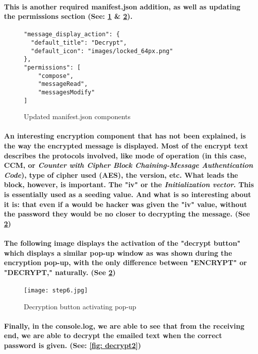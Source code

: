 \paragraph{This is another required manifest.json addition, as well as updating the permissions section (See: \ref{fig: updateManifest} \& \ref{fig: decrypt1}).}

\begin{figure}[H]
\centering
\begin{verbatim}
"message_display_action": {
  "default_title": "Decrypt",
  "default_icon": "images/locked_64px.png"
},
"permissions": [
    "compose",
    "messageRead",
	"messagesModify"
]
\end{verbatim}
\caption{\label{fig: updateManifest} Updated manifest.json components}
\end{figure}

\paragraph{An interesting encryption component that has not been explained, is the way the encrypted message is displayed. Most of the encrypt text describes the protocols involved, like mode of operation (in this case, CCM, or \emph{Counter with Cipher Block Chaining-Message Authentication Code}), type of cipher used (AES), the version, etc. What leads the block, however, is important. The "iv" or the \emph{Initialization vector}. This is essentially used as a seeding value. And what is so interesting about it is: that even if a would be hacker was given the "iv" value, without the password they would be no closer to decrypting the message. (See \ref{fig: decrypt1})}\cite[p.170]{Schneier}

\paragraph{The following image displays the activation of the "decrypt button" which displays a similar pop-up window as was shown during the encryption pop-up, with the only difference between "ENCRYPT" or "DECRYPT," naturally.  (See \ref{fig: decrypt1})}


\begin{figure}[H]
    \centering
    \texttt{[image: step6.jpg]}
    \caption{\label{fig: decrypt1} Decryption button activating pop-up}
\end{figure}

\paragraph{Finally, in the console.log, we are able to see that from the receiving end, we are able to decrypt the emailed text when the correct password is given. (See: \ref{fig: decrypt2})}


